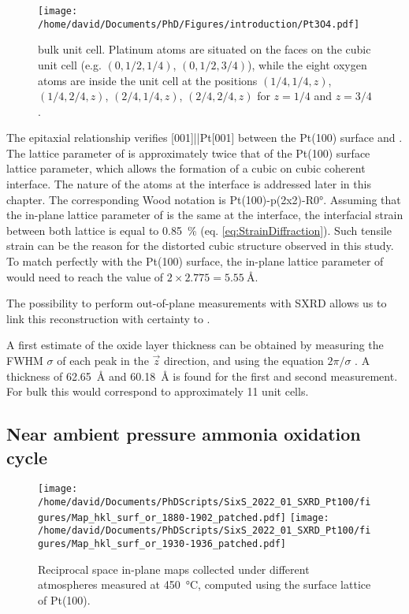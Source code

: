 \begin{SCfigure}
    \centering
    \texttt{[image: /home/david/Documents/PhD/Figures/introduction/Pt3O4.pdf]}
    \caption{
         bulk unit cell.
        Platinum atoms are situated on the faces on the cubic unit cell (e.g. $(0, 1/2, 1/4)$, $(0, 1/2, 3/4)$), while the eight oxygen atoms are inside the unit cell at the positions $(1/4, 1/4, z)$, $(1/4, 2/4, z)$, $(2/4, 1/4, z)$, $(2/4, 2/4, z)$ for $z=1/4$ and $z=3/4$.
    }
    \label{fig:Pt3O4}
\end{SCfigure}

The epitaxial relationship verifies [001]||Pt[001] between the Pt(100) surface and .
The lattice parameter of  is approximately twice that of the Pt(100) surface lattice parameter, which allows the formation of a cubic on cubic coherent interface.
The nature of the atoms at the interface is addressed later in this chapter.
The corresponding Wood notation is Pt(100)-p(2x2)-R\ang{0}.
Assuming that the in-plane lattice parameter of  is the same at the interface, the interfacial strain between both lattice is equal to \qty{0.85}{\percent} (eq. \ref{eq:StrainDiffraction}).
Such tensile strain can be the reason for the distorted cubic structure observed in this study.
To match perfectly with the Pt(100) surface, the in-plane lattice parameter of  would need to reach the value of $2\times2.775=\qty{5.55}{\angstrom}$.

The possibility to perform out-of-plane measurements with SXRD allows us to link this reconstruction with certainty to .

A first estimate of the oxide layer thickness can be obtained by measuring the FWHM $\sigma$ of each peak in the $\vec{z}$ direction, and using  the equation $2\pi/\sigma$ \parencite{Warren1990}.
A thickness of \qty{62.65}{\angstrom} and \qty{60.18}{\angstrom} is found for the first and second measurement.
For bulk  this would correspond to approximately \num{11} unit cells.

\subsection{Near ambient pressure ammonia oxidation cycle}

\begin{figure}[!htb]
    \centering
    \texttt{[image: /home/david/Documents/PhDScripts/SixS\_2022\_01\_SXRD\_Pt100/figures/Map\_hkl\_surf\_or\_1880-1902\_patched.pdf]}
    \texttt{[image: /home/david/Documents/PhDScripts/SixS\_2022\_01\_SXRD\_Pt100/figures/Map\_hkl\_surf\_or\_1930-1936\_patched.pdf]}
    \caption{
        Reciprocal space in-plane maps collected under different atmospheres measured at \qty{450}{\degreeCelsius}, computed using the surface lattice of Pt(100).
    }
    \label{fig:MapsPt100B}
\end{figure}

